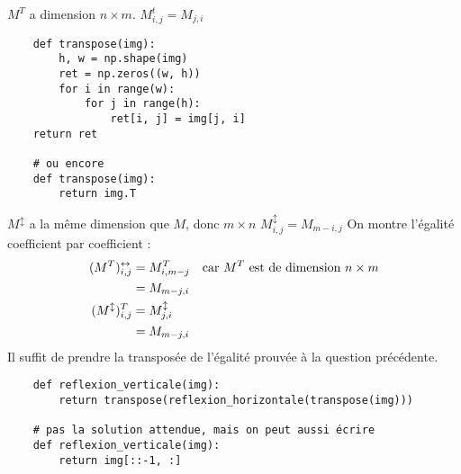 \ques
\ssques $ M^T $ a dimension $ n \times m $.
\ssques $ M^t_{i,j} = M_{j, i} $
\ssques \begin{verbatim}
    def transpose(img):
        h, w = np.shape(img)
        ret = np.zeros((w, h))
        for i in range(w):
            for j in range(h):
                ret[i, j] = img[j, i]
    return ret

    # ou encore
    def transpose(img):
        return img.T
\end{verbatim}

\ques
\ssques $ M^{\updownarrow} $ a la même dimension que $ M $, donc $ m \times n $
\ssques $ M^{\updownarrow}_{i, j} = M_{m-i, j} $
\ssques On montre l'égalité coefficient par coefficient :
\begin{align*}
    (M^T)^{\leftrightarrow}_{i,j} &= M^T_{i, m-j} \quad \textrm{car $ M^T $ est de dimension $ n \times m $} \\
                                  &= M_{m-j, i} \\
    (M^{\updownarrow})^T_{i,j} &=  M^{\updownarrow}_{j,i} \\
                               &= M_{m-j, i}
\end{align*}
\ssques Il suffit de prendre la transposée de l'égalité prouvée à la question précédente.

\ques 

\begin{verbatim}
    def reflexion_verticale(img):
        return transpose(reflexion_horizontale(transpose(img)))

    # pas la solution attendue, mais on peut aussi écrire
    def reflexion_verticale(img):
        return img[::-1, :]
\end{verbatim}

